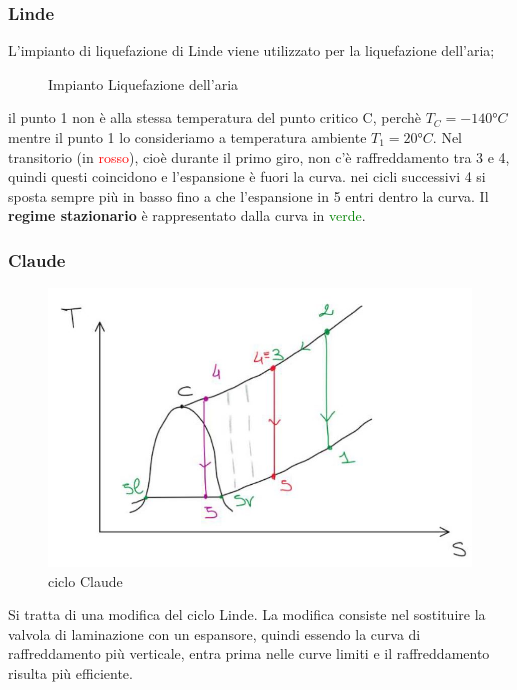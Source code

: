 \documentclass[a4paper]{article}
\numberwithin{equation}{section}%
\begin{document}
\subsubsection{Linde}
L'impianto di liquefazione di Linde viene utilizzato per la liquefazione dell'aria;
\begin{figure}[H]
	\begin{center}
			\end{center}
	\caption{Impianto Liquefazione dell'aria}
\end{figure}

il punto 1 non è alla stessa temperatura del punto critico C, perchè $T_C=-140°C$ mentre il punto 1 lo consideriamo a temperatura ambiente $T_1=20°C$.
Nel transitorio (in \textcolor{red}{rosso}), cioè durante il primo giro, non c'è raffreddamento tra 3 e 4, quindi questi coincidono e l'espansione è fuori la curva. nei cicli successivi 4 si sposta sempre più in basso fino a che l'espansione in 5 entri dentro la curva.
Il \textbf{regime stazionario } è rappresentato dalla curva in \textcolor{green}{verde}.

\subsubsection{Claude}

\begin{figure}[H]
	\begin{center}
		\includegraphics[width=0.4\columnwidth]{Claude.jpg}
	\end{center}
	\caption{ciclo Claude}
\end{figure}
Si tratta di una modifica del ciclo Linde.
La modifica consiste nel sostituire la valvola di laminazione con un espansore, quindi essendo la curva di raffreddamento più verticale, entra prima nelle curve limiti e il raffreddamento risulta più efficiente.
\end{document}

